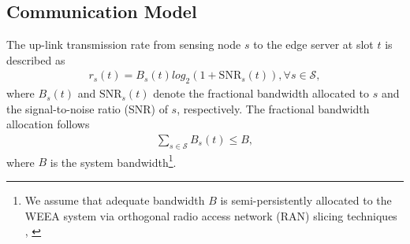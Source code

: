 \documentclass[lettersize,journal]{IEEEtran}
\theoremstyle{custom}
\begin{document}





\subsection{Communication Model}
The up-link transmission rate from sensing node $s$ to the edge server at slot $t$ is described as
\begin{align}
    r_{s}(t) = B_s(t) log_2\left(1 + \mathrm{SNR}_s(t) \right), \forall s \in \mathcal{S}, 
\end{align}
where $B_s(t)$ and $\mathrm{SNR}_s(t)$ denote the fractional bandwidth allocated to $s$ and the signal-to-noise ratio (SNR) of $s$, respectively. The fractional bandwidth allocation follows
\begin{align}\label{bandwidth_cons}
    \sum_{s \in \mathcal{S}}B_s(t) \leq B, 
\end{align}
where $B$ is the system bandwidth\footnote{We assume that adequate bandwidth $B$ is semi-persistently allocated to the WEEA system via orthogonal radio access network (RAN) slicing techniques \cite{}, \cite{}}. 
\end{document}
